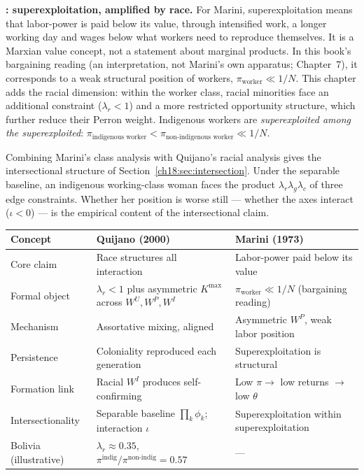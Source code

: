 \documentclass[../structural_economics_book.tex]{subfiles}
\begin{document}
\textbf{\citet{marini1973dialectica}: superexploitation, amplified by race.} For Marini, superexploitation means that labor-power is paid below its value, through intensified work, a longer working day and wages below what workers need to reproduce themselves. It is a Marxian value concept, not a statement about marginal products. In this book's bargaining reading (an interpretation, not Marini's own apparatus; Chapter~7), it corresponds to a weak structural position of workers, $\pi_{\text{worker}} \ll 1/N$. This chapter adds the racial dimension: within the worker class, racial minorities face an additional constraint ($\lambda_r < 1$) and a more restricted opportunity structure, which further reduce their Perron weight. Indigenous workers are \textit{superexploited among the superexploited}: $\pi_{\text{indigenous worker}} < \pi_{\text{non-indigenous worker}} \ll 1/N$.

Combining Marini's class analysis with Quijano's racial analysis gives the intersectional structure of Section~\ref{ch18:sec:intersection}. Under the separable baseline, an indigenous working-class woman faces the product $\lambda_r \lambda_g \lambda_c$ of three edge constraints. Whether her position is worse still --- whether the axes interact ($\iota < 0$) --- is the empirical content of the intersectional claim.

\begin{center}
\begin{tabularx}{\textwidth}{LLL}
\toprule
\textbf{Concept} & \textbf{Quijano (2000)} & \textbf{Marini (1973)} \\
\midrule
Core claim & Race structures all interaction & Labor-power paid below its value \\
Formal object & $\lambda_r < 1$ plus asymmetric $K^{\max}$ across $W^U, W^P, W^I$ & $\pi_{\text{worker}} \ll 1/N$ (bargaining reading) \\
Mechanism & Assortative mixing, aligned & Asymmetric $W^P$, weak labor position \\
Persistence & Coloniality reproduced each generation & Superexploitation is structural \\
Formation link & Racial $W^I$ produces self-confirming & Low $\pi \to$ low returns $\to$ low $\theta$ \\
Intersectionality & Separable baseline $\prod_k\phi_k$; interaction $\iota$ & Superexploitation within superexploitation \\
Bolivia (illustrative) & $\lambda_r \approx 0.35$, $\pi^{\text{indig}}/\pi^{\text{non-indig}} = 0.57$ & --- \\
\bottomrule
\end{tabularx}
\end{center}
\end{document}
